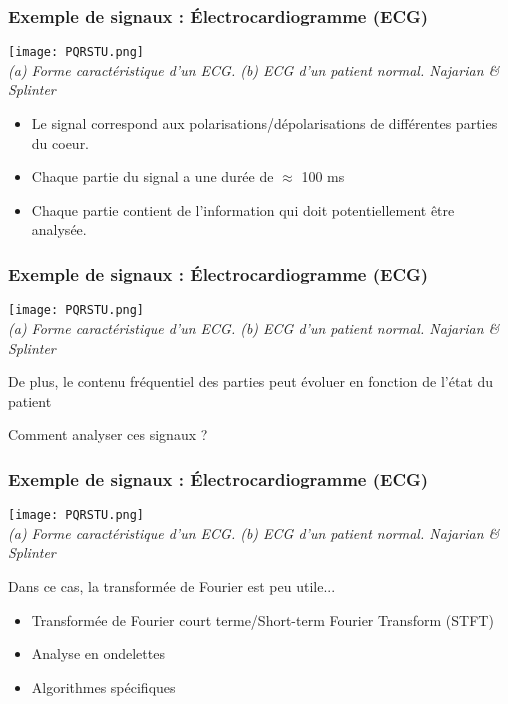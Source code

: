\documentclass{beamer}
\begin{document}
\begin{frame}
\frametitle{Exemple de signaux : \'Electrocardiogramme (ECG)}
\begin{center}
\texttt{[image: PQRSTU.png]}\\
\textit{\footnotesize (a) Forme caractéristique d'un ECG. (b) ECG d'un patient normal. Najarian \& Splinter}
\end{center}
\begin{itemize}
\item Le signal correspond aux polarisations/dépolarisations de différentes parties du coeur.
\item Chaque partie du signal a une durée de $\approx$ 100 ms
\item Chaque partie contient de l'information qui doit potentiellement être analysée.
\end{itemize}
\end{frame}

\begin{frame}
\frametitle{Exemple de signaux : \'Electrocardiogramme (ECG)}
\begin{center}
\texttt{[image: PQRSTU.png]}\\
\textit{\footnotesize (a) Forme caractéristique d'un ECG. (b) ECG d'un patient normal. Najarian \& Splinter}
\end{center}
De plus, le contenu fréquentiel des parties peut évoluer en fonction de l'état du patient
\vspace{0.1cm}
\begin{block}{}
Comment analyser ces signaux  ?
\end{block}
\end{frame}

\begin{frame}
\frametitle{Exemple de signaux : \'Electrocardiogramme (ECG)}
\begin{center}
\texttt{[image: PQRSTU.png]}\\
\textit{\footnotesize (a) Forme caractéristique d'un ECG. (b) ECG d'un patient normal. Najarian \& Splinter}
\end{center}
Dans ce cas, la transformée de Fourier est peu utile...
\begin{itemize}
\item Transformée de Fourier court terme/Short-term Fourier Transform (STFT)
\item Analyse en ondelettes
\item Algorithmes spécifiques
\end{itemize}
\end{frame}
\end{document}
